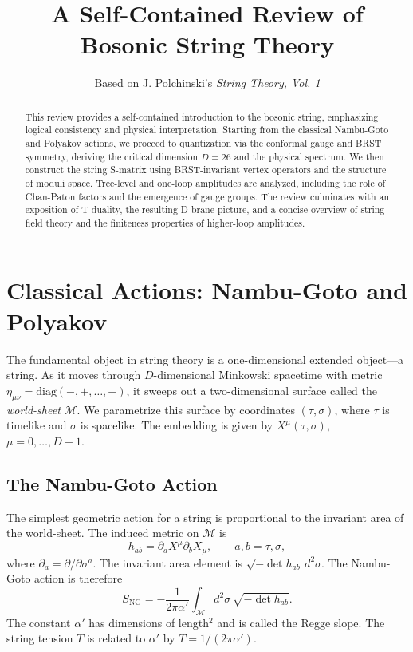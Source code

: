 \documentclass[11pt]{article}
\title{A Self-Contained Review of Bosonic String Theory}
\author{Based on J. Polchinski's \textit{String Theory, Vol. 1}}
\date{}
\begin{document}
\maketitle

\begin{abstract}
This review provides a self-contained introduction to the bosonic string, emphasizing logical consistency and physical interpretation. Starting from the classical Nambu-Goto and Polyakov actions, we proceed to quantization via the conformal gauge and BRST symmetry, deriving the critical dimension $D=26$ and the physical spectrum. We then construct the string S-matrix using BRST-invariant vertex operators and the structure of moduli space. Tree-level and one-loop amplitudes are analyzed, including the role of Chan-Paton factors and the emergence of gauge groups. The review culminates with an exposition of T-duality, the resulting D-brane picture, and a concise overview of string field theory and the finiteness properties of higher-loop amplitudes.
\end{abstract}

\section{Classical Actions: Nambu-Goto and Polyakov}

The fundamental object in string theory is a one-dimensional extended object—a string. As it moves through $D$-dimensional Minkowski spacetime with metric $\eta_{\mu\nu} = \mathrm{diag}(-, +, \dots, +)$, it sweeps out a two-dimensional surface called the \emph{world-sheet} $\mathcal{M}$. We parametrize this surface by coordinates $(\tau, \sigma)$, where $\tau$ is timelike and $\sigma$ is spacelike. The embedding is given by $X^\mu(\tau, \sigma)$, $\mu = 0, \dots, D-1$.

\subsection{The Nambu-Goto Action}

The simplest geometric action for a string is proportional to the invariant area of the world-sheet. The induced metric on $\mathcal{M}$ is
\begin{equation}
h_{ab} = \partial_a X^\mu \partial_b X_\mu, \qquad a,b = \tau,\sigma,
\end{equation}
where $\partial_a = \partial/\partial\sigma^a$. The invariant area element is $\sqrt{-\det h_{ab}}\, d^2\sigma$. The Nambu-Goto action is therefore
\begin{equation}
S_{\mathrm{NG}} = -\frac{1}{2\pi\alpha'} \int_{\mathcal{M}} d^2\sigma \, \sqrt{-\det h_{ab}}. \label{eq:NG}
\end{equation}
The constant $\alpha'$ has dimensions of length$^2$ and is called the Regge slope. The string tension $T$ is related to $\alpha'$ by $T = 1/(2\pi\alpha')$. 
\end{document}
